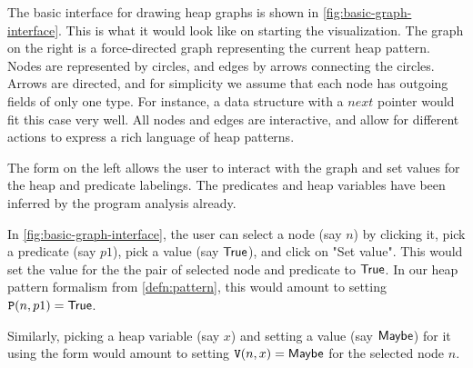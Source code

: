 The basic interface for drawing heap graphs is shown in
\autoref{fig:basic-graph-interface}. This is what it would look like on starting the
visualization. The graph on the right is a force-directed graph representing the current
heap pattern. Nodes are represented by circles, and edges by arrows connecting the
circles. Arrows are directed, and for simplicity we assume that each node has outgoing
fields of only one type. For instance, a data structure with a $next$ pointer would fit
this case very well. All nodes and edges are interactive, and allow for different
actions to express a rich language of heap patterns.

The form on the left allows the user to interact with the graph and set values for the
heap and predicate labelings. The predicates and heap variables have been inferred by
the program analysis already.

\begin{ex}
\label{ex:basic-graph-interface}
In \autoref{fig:basic-graph-interface}, the user can select a node (say $n$) by clicking
it, pick a predicate (say $p1$), pick a value (say $\mathsf{True}$), and click on "Set value".
This would set the value for the the pair of selected node and predicate to $\mathsf{True}$. In
our heap pattern formalism from \autoref{defn:pattern}, this would amount to setting
$\mathtt{P}(n, p1) = \mathsf{True}$.

Similarly, picking a heap variable (say $x$) and setting a value (say $\mathsf{Maybe}$) for it
using the form would amount to setting $\mathtt{V}(n,x) = \mathsf{Maybe}$ for the selected node
$n$.
\end{ex}

